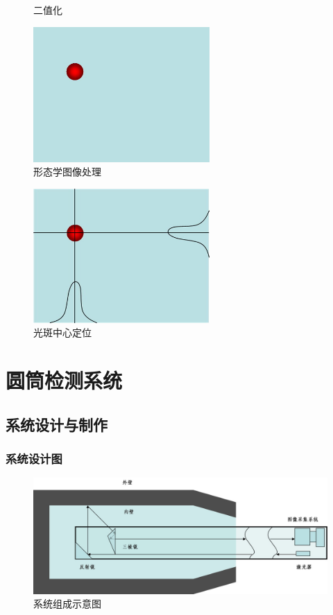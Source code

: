 \documentclass{beamer}
\begin{document}
\begin{frame}
\begin{overprint}
\begin{figure}
    \caption{二值化}
    \end{figure}
    \begin{figure}
    \center
    \includegraphics[width=0.6\textwidth]{image/spot4}
    \caption{形态学图像处理}
    \end{figure}
    \begin{figure}
    \center
    \includegraphics[width=0.6\textwidth]{image/spot5}
    \caption{光斑中心定位}
    \end{figure}
  \end{overprint}
\end{frame}

\section{圆筒检测系统}

\subsection{系统设计与制作}

\begin{frame}
  \frametitle{系统设计图}
    \begin{figure}
    \center
    \includegraphics[width=\textwidth]{image/systemmodel}
    \caption{\small 系统组成示意图}
    \end{figure}
\end{frame}
\end{document}

